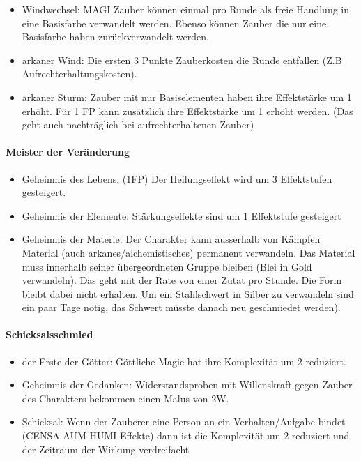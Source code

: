 \documentclass{article}
\begin{document}
\begin{itemize}
\item Windwechsel: MAGI Zauber können einmal pro Runde als freie Handlung in eine Basisfarbe verwandelt werden. Ebenso können Zauber die nur eine Basisfarbe haben zurückverwandelt werden.
\item arkaner Wind: Die ersten 3 Punkte Zauberkosten die Runde entfallen (Z.B Aufrechterhaltungskosten).
\item arkaner Sturm: Zauber mit nur Basiselementen haben ihre Effektstärke um 1 erhöht. Für 1 FP kann zusätzlich ihre Effektstärke um 1 erhöht werden. (Das geht auch nachträglich bei aufrechterhaltenen Zauber)
\end{itemize}

\paragraph{Meister der Veränderung}

\begin{itemize}
\item Geheimnis des Lebens: (1FP) Der Heilungseffekt wird um 3 Effektstufen gesteigert.
\item Geheimnis der Elemente: Stärkungseffekte sind um 1 Effektstufe gesteigert
\item Geheimnis der Materie: Der Charakter kann ausserhalb von Kämpfen Material (auch arkanes/alchemistisches) permanent verwandeln. Das Material muss innerhalb seiner übergeordneten Gruppe bleiben (Blei in Gold verwandeln). Das geht mit der Rate von einer Zutat pro Stunde. Die Form bleibt dabei nicht erhalten. Um ein Stahlschwert in Silber zu verwandeln sind ein paar Tage nötig, das Schwert müsste danach neu geschmiedet werden).
\end{itemize}

\paragraph{Schicksalsschmied}

\begin{itemize}
\item der Erste der Götter: Göttliche Magie hat ihre Komplexität um 2 reduziert.
\item Geheimnis der Gedanken: Widerstandsproben mit Willenskraft gegen Zauber des Charakters bekommen einen Malus von 2W.
\item Schicksal: Wenn der Zauberer eine Person an ein Verhalten/Aufgabe bindet (CENSA AUM HUMI Effekte) dann ist die Komplexität um 2 reduziert und der Zeitraum der Wirkung verdreifacht
\end{itemize}
\end{document}
